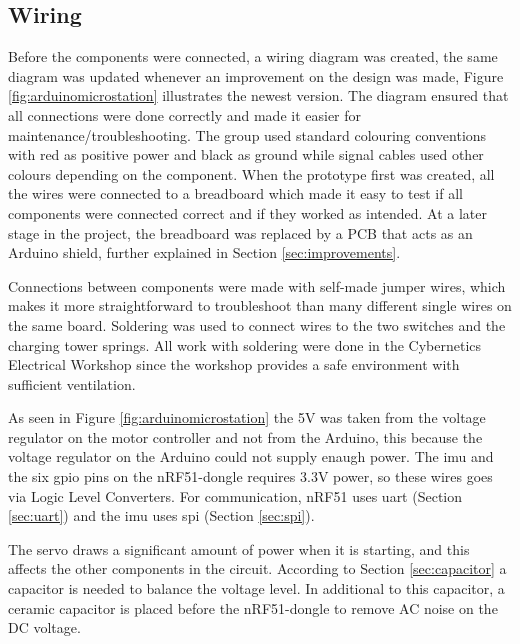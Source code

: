 \subsection{Wiring}
Before the components were connected, a wiring diagram was created, the same diagram was updated whenever an improvement on the design was made, Figure \ref{fig:arduinomicrostation} illustrates the newest version. The diagram ensured that all connections were done correctly and made it easier for maintenance/troubleshooting. The group used standard colouring conventions with red as positive power and black as ground while signal cables used other colours depending on the component. When the prototype first was created, all the wires were connected to a breadboard which made it easy to test if all components were connected correct and if they worked as intended. At a later stage in the project, the breadboard was replaced by a PCB that acts as an Arduino shield, further explained in Section \ref{sec:improvements}.

Connections between components were made with self-made jumper wires, which makes it more straightforward to troubleshoot than many different single wires on the same board. Soldering was used to connect wires to the two switches and the charging tower springs. All work with soldering were done in the Cybernetics Electrical Workshop since the workshop provides a safe environment with sufficient ventilation.

As seen in Figure \ref{fig:arduinomicrostation} the 5V was taken from the voltage regulator on the motor controller and not from the Arduino, this because the voltage regulator on the Arduino could not supply enaugh power. The \acrshort{imu} and the six \acrshort{gpio} pins on the nRF51-dongle requires 3.3V power, so these wires goes via Logic Level Converters. For communication, nRF51 uses \acrshort{uart} (Section \ref{sec:uart}) and the \acrshort{imu} uses \acrshort{spi} (Section \ref{sec:spi}).

The servo draws a significant amount of power when it is starting, and this affects the other components in the circuit. According to Section \ref{sec:capacitor} a capacitor is needed to balance the voltage level. In additional to this capacitor, a ceramic capacitor is placed before the nRF51-dongle to remove AC noise on the DC voltage.